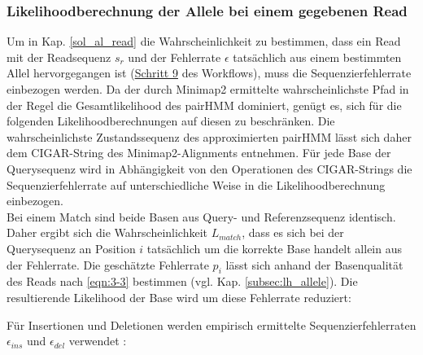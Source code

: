 \subsubsection{Likelihoodberechnung der Allele bei einem gegebenen Read} \label{pHMM_alleles}

Um in Kap. \ref{sol_al_read} die Wahrscheinlichkeit zu bestimmen, dass ein Read mit der Readsequenz $s_{r}$ und der Fehlerrate $\epsilon$ tatsächlich aus einem bestimmten Allel hervorgegangen ist (\hyperref[step9]{Schritt 9\label{step9txt}} des Workflows), muss die Sequenzierfehlerrate einbezogen werden. Da der durch Minimap2 ermittelte wahrscheinlichste Pfad in der Regel die Gesamtlikelihood des pairHMM dominiert, genügt es, sich für die folgenden Likelihoodberechnungen auf diesen zu beschränken. Die wahrscheinlichste Zustandssequenz des approximierten pairHMM lässt sich daher dem CIGAR-String des Minimap2-Alignments entnehmen. Für jede Base der Querysequenz wird in Abhängigkeit von den Operationen des CIGAR-Strings die Sequenzierfehlerrate auf unterschiedliche Weise in die Likelihoodberechnung einbezogen. \\

Bei einem Match sind beide Basen aus Query- und Referenzsequenz identisch. Daher ergibt sich die Wahrscheinlichkeit $L_{match}$, dass es sich bei der Querysequenz an Position $i$ tatsächlich um die korrekte Base handelt allein aus der Fehlerrate. Die geschätzte Fehlerrate $ p_{i} $ lässt sich anhand der Basenqualität des Reads nach \eqref{eqn:3-3} bestimmen (vgl. Kap. \ref{subsec:lh_allele}). Die resultierende Likelihood der Base wird um diese Fehlerrate reduziert:
\vspace{-0.5cm}
\begin{center}
\end{center}
Für Insertionen und Deletionen werden empirisch ermittelte Sequenzierfehlerraten $\epsilon_{ins}$ und $\epsilon_{del}$ verwendet \cite{schirmer_2016}: 
\vspace{-0.5cm}
\begin{center}
\end{center}

